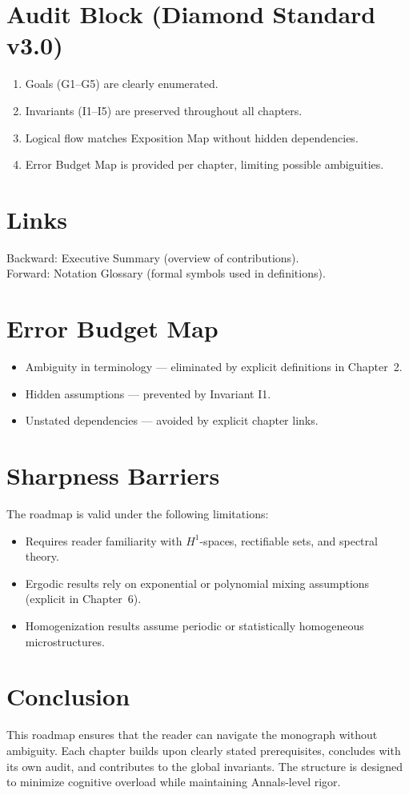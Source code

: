 \section*{Audit Block (Diamond Standard v3.0)}
\begin{enumerate}[label=A\arabic*.]
  \item Goals (G1--G5) are clearly enumerated.
  \item Invariants (I1--I5) are preserved throughout all chapters.
  \item Logical flow matches Exposition Map without hidden dependencies.
  \item Error Budget Map is provided per chapter, limiting possible ambiguities.
\end{enumerate}

\section*{Links}
Backward: Executive Summary (overview of contributions). \\
Forward: Notation Glossary (formal symbols used in definitions).

\section*{Error Budget Map}
\begin{itemize}
  \item Ambiguity in terminology --- eliminated by explicit definitions in Chapter~2.
  \item Hidden assumptions --- prevented by Invariant I1.
  \item Unstated dependencies --- avoided by explicit chapter links.
\end{itemize}

\section*{Sharpness Barriers}
The roadmap is valid under the following limitations:
\begin{itemize}
  \item Requires reader familiarity with $H^1$-spaces, rectifiable sets, and spectral theory.
  \item Ergodic results rely on exponential or polynomial mixing assumptions (explicit in Chapter~6).
  \item Homogenization results assume periodic or statistically homogeneous microstructures.
\end{itemize}

\section*{Conclusion}
This roadmap ensures that the reader can navigate the monograph without
ambiguity. Each chapter builds upon clearly stated prerequisites, concludes with
its own audit, and contributes to the global invariants. The structure is designed
to minimize cognitive overload while maintaining Annals-level rigor.
